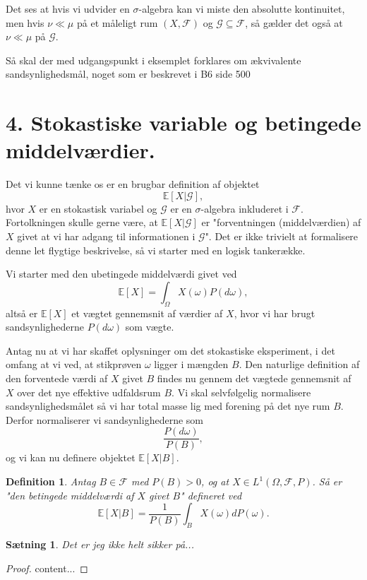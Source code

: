 \documentclass[12pt]{report}
\newtheorem{theorem}[lemma]{Sætning}
\newtheorem{definition}[lemma]{Definition}
\theoremstyle{break}
\newtheorem*{proof}{Bevis}
\theoremstyle{break}
\newcommand{\EE}{\mathbb{E}}
\newcommand{\G}{\mathcal{G}}
\newcommand{\FI}{\mathcal{F}}
\newcommand{\1}{\mathds{1}}
\begin{document}
Det ses at hvis vi udvider en $\sigma$-algebra kan vi miste den absolutte kontinuitet, men hvis  $\nu\ll\mu$ på et måleligt rum $(X,\FI)$ og $\G\subseteq\FI$, så gælder det også at $\nu\ll\mu$ på $\G$.

Så skal der med udgangspunkt i eksemplet forklares om ækvivalente sandsynlighedsmål, noget som er beskrevet i B6 side 500



\newpage

\section*{4. Stokastiske variable og betingede middelværdier.}
Det vi kunne tænke os er en brugbar definition af objektet
\[ \EE[X|\G], \]
hvor $X$ er en stokastisk variabel og $\G$ er en 	$\sigma$-algebra inkluderet i $\FI$. Fortolkningen skulle gerne være, at $\EE[X|\G]$ er "forventningen (middelværdien) af $X$ givet at vi har adgang til informationen i $\G$". Det er ikke trivielt at formalisere denne let flygtige beskrivelse, så vi starter med en logisk tankerække.

Vi starter med den ubetingede middelværdi givet ved
\[ \EE[X]=\int_{\Omega}X(\omega)P(d\omega), \]
altså er $\EE[X]$ et vægtet gennemsnit af værdier af $X$, hvor vi har brugt sandsynlighederne $P(d\omega)$ som vægte.

Antag nu at vi har skaffet oplysninger om det stokastiske eksperiment, i det omfang at vi ved, at stikprøven $\omega$ ligger i mængden $B$. Den naturlige definition af den forventede værdi af $X$ givet $B$ findes nu gennem det vægtede gennemsnit af $X$ over det nye effektive udfaldsrum $B$. Vi skal selvfølgelig normalisere sandsynlighedsmålet så vi har total masse lig med forening på det nye rum $B$. Derfor normaliserer vi sandsynlighederne som 
\[ \frac{P(d\omega)}{P(B)}, \]
og vi kan nu definere objektet $\EE[X|B]$.
\begin{definition}
	Antag $B\in \FI$ med $P(B)>0$, og at $X\in L^1(\Omega,\FI,P)$. Så er "den betingede middelværdi af $X$ givet $B$"  defineret ved
	\[ \EE[X|B]=\frac{1}{P(B)}\int_B X(\omega)dP(\omega).\]
\end{definition}
\begin{theorem}
	Det er jeg ikke helt sikker på...
\end{theorem}
\begin{proof}
	content...
\end{proof}
\newpage
\end{document}
